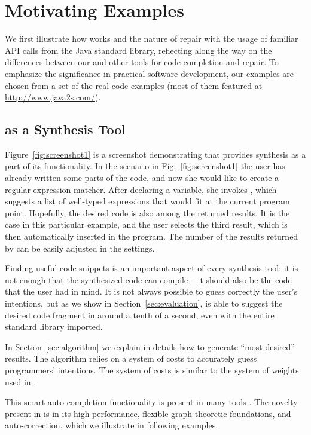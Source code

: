\section{Motivating Examples}
\label{sec:examples}

We first illustrate how \ourTool works and the nature of repair with the usage of familiar API calls from the Java standard library, reflecting along the way on the differences between our and other tools for code completion and repair. To emphasize the significance in practical software development, our examples are chosen from a set of the real code examples (most of them featured at \url{http://www.java2s.com/}{}).

\subsection{\ourTool as a Synthesis Tool}

Figure~\ref{fig:screenshot1} is a screenshot demonstrating that \ourTool provides synthesis as a part of its functionality. In the scenario in Fig.~\ref{fig:screenshot1} the user has already written some parts of the code, and now she would like to create a regular expression matcher. After declaring a variable, she invokes \ourTool, which suggests a list of well-typed expressions that would fit at the current program point. Hopefully, the desired code is also among the returned results. It is the case in this particular example, and the user selects the third result, which is then automatically inserted in the program. The number of the results returned by \ourTool can be easily adjusted in the settings.

Finding useful code snippets is an important aspect of every synthesis tool: it is not enough that the synthesized code can compile -- it should also be the code that the user had in mind. It is not always possible to guess correctly the user's intentions, but as we show in Section~\ref{sec:evaluation}, \ourTool is able to suggest the desired code fragment in around a tenth of a second, even with the entire standard library imported.

In Section~\ref{sec:algorithm} we explain in details how to generate ``most desired'' results. The \ourTool algorithm relies on a system of costs to accurately guess programmers' intentions. The system of costs is similar to the system of weights used in \cite{GveroETAL13CompleteCompletionTypesWeights}.

This smart auto-completion functionality is present in many tools \cite{MandelinetALL2005Jungloid, GveroETAL13CompleteCompletionTypesWeights, PerelmanGBG12}. The novelty present in \ourTool is in its high performance, flexible graph-theoretic foundations, and auto-correction, which we illustrate in following examples.


